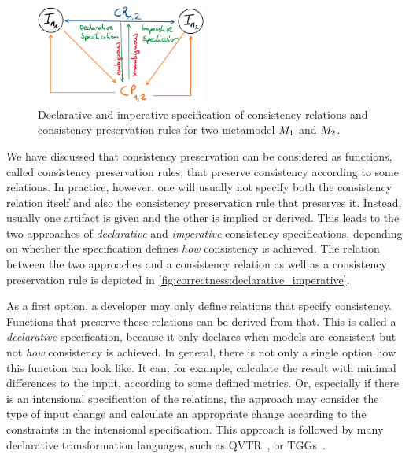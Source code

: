 \begin{figure}
    \centering
    \includegraphics[width=0.5\textwidth]{figures/correctness/notion/declarative_imperative}
    \caption[Declarative and imperative consistency specification]{Declarative and imperative specification of consistency relations and consistency preservation rules for two metamodel $\metamodel{M}{1}$ and $\metamodel{M}{2}$.}
    \label{fig:correctness:declarative_imperative}
\end{figure}

We have discussed that consistency preservation can be considered as functions, called consistency preservation rules, that preserve consistency according to some relations.
In practice, however, one will usually not specify both the consistency relation itself and also the consistency preservation rule that preserves it.
Instead, usually one artifact is given and the other is implied or derived.
This leads to the two approaches of \emph{declarative} and \emph{imperative} consistency specifications, depending on whether the specification defines \emph{how} consistency is achieved.
The relation between the two approaches and a consistency relation as well as a consistency preservation rule is depicted in \autoref{fig:correctness:declarative_imperative}.

As a first option, a developer may only define relations that specify consistency. Functions that preserve these relations can be derived from that.
This is called a \emph{declarative} specification, because it only declares when models are consistent but not \emph{how} consistency is achieved.
In general, there is not only a single option how this function can look like.
It can, for example, calculate the result with minimal differences to the input, according to some defined metrics.
Or, especially if there is an intensional specification of the relations, the approach may consider the type of input change and calculate an appropriate change according to the constraints in the intensional specification.
This approach is followed by many declarative transformation languages, such as \gls{QVTR}~\cite{qvt}, or \glspl{TGG}~\cite{anjorin2014b}.

